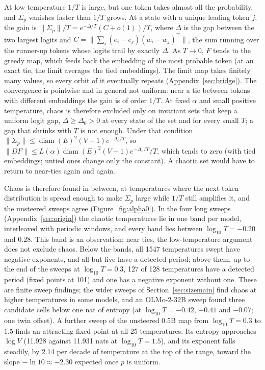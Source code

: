 \documentclass[11pt,letterpaper]{article}
\begin{document}
At low temperature $1/T$ is large, but one token takes almost all the probability, and $\Sigma_p$ vanishes faster than
$1/T$ grows. At a state with a unique leading token $j$, the gain is $\|\Sigma_p\|/T=e^{-\Delta/T}(C+o(1))/T$, where
$\Delta$ is the gap between the two largest logits and $C=\lVert\sum_i(e_i-e_j)(w_i-w_j)^{\top}\rVert$, the sum
running over the runner-up tokens whose logits trail by exactly $\Delta$. As $T\to0$, $F$ tends to the greedy map,
which feeds back the embedding of the most probable token (at an exact tie, the limit averages the tied embeddings).
The limit map takes finitely many values, so every orbit of it eventually repeats (Appendix~\ref{sec:bridge}). The convergence is pointwise and in general not uniform: near a tie between tokens with different embeddings the gain is of order $1/T$.
At fixed $\alpha$ and small positive temperature, chaos is therefore excluded only on invariant sets that keep a
uniform logit gap, $\Delta\ge\Delta_0>0$ at every state of the set and for every small $T$; a gap that shrinks
with $T$ is not enough. Under that condition $\|\Sigma_p\|\le\operatorname{diam}(E)^2(V-1)e^{-\Delta_0/T}$, so
$\|DF\|\le L(\alpha)\operatorname{diam}(E)^2(V-1)e^{-\Delta_0/T}/T$, which tends to zero (with tied embeddings; untied
ones change only the constant). A chaotic set would have to return to near-ties again and again.

Chaos is therefore found in between, at temperatures where the next-token distribution is spread enough to make
$\Sigma_p$ large while $1/T$ still amplifies it, and the unsteered sweeps agree (Figure~\ref{fig:alpha0}). In the four
long sweeps (Appendix~\ref{sec:origin}) the chaotic temperatures lie in one band per model, interleaved with periodic
windows, and every band lies between $\log_{10}T=-0.20$ and $0.28$. This band is an observation; near ties, the
low-temperature argument does not exclude chaos. Below the bands, all
1547 temperatures swept have negative exponents, and all but five have a detected period; above them, up to the end
of the sweeps at $\log_{10}T=0.3$, 127 of 128 temperatures have a detected period (fixed points at 101) and one has a
negative exponent without one. These are finite sweep findings; the wider sweeps of Section~\ref{sec:sizemain} find chaos
at higher temperatures in some models, and an OLMo-2-32B sweep found three candidate cells below one nat of entropy (at $\log_{10}T=-0.42$, $-0.41$ and $-0.07$; one twin
offset). A further sweep of the unsteered 0.5B map from
$\log_{10}T=0.3$ to $1.5$ finds an attracting fixed point at all 25 temperatures. Its entropy approaches $\log V$
(11.928 against 11.931 nats at $\log_{10}T=1.5$), and its exponent falls steadily, by 2.14 per decade of temperature
at the top of the range, toward the slope $-\ln10\approx-2.30$ expected once $p$ is uniform.
\end{document}
